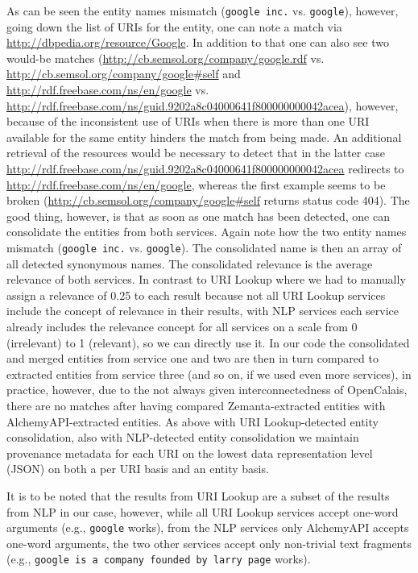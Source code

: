 \documentclass{acm_proc_article-sp}
\begin{document}
As can be seen the entity names mismatch (\texttt{google inc.} vs. \texttt{google}), however, going down the list of URIs for the entity, one can note a match via \url{http://dbpedia.org/resource/Google}. In addition to that one can also see two would-be matches (\url{http://cb.semsol.org/company/google.rdf} vs. \url{http://cb.semsol.org/company/google#self} and \url{http://rdf.freebase.com/ns/en/google} vs. \url{http://rdf.freebase.com/ns/guid.9202a8c04000641f800000000042acea}), however, because of the inconsistent use of URIs when there is more than one URI available for the same entity hinders the match from being made. An additional retrieval of the resources would be necessary to detect that in the latter case \url{http://rdf.freebase.com/ns/guid.9202a8c04000641f800000000042acea} redirects to \url{http://rdf.freebase.com/ns/en/google}, whereas the first example seems to be broken (\url{http://cb.semsol.org/company/google#self} returns status code 404). The good thing, however, is that as soon as one match has been detected, one can consolidate the entities from both services. Again note how the two entity names mismatch (\texttt{google inc.} vs. \texttt{google}). The consolidated name is then an array of all detected synonymous names. The consolidated relevance is the average relevance of both services. In contrast to URI Lookup where we had to manually assign a relevance of 0.25 to each result because not all URI Lookup services include the concept of relevance in their results, with NLP services each service already includes the relevance concept for all services on a scale from 0 (irrelevant) to 1 (relevant), so we can directly use it. In our code the consolidated and merged entities from service one and two are then in turn compared to extracted entities from service three (and so on, if we used even more services), in practice, however, due to the not always given interconnectedness of OpenCalais, there are no matches after having compared Zemanta-extracted entities with AlchemyAPI-extracted entities. As above with URI Lookup-detected entity consolidation, also with NLP-detected entity consolidation we maintain provenance metadata for each URI on the lowest data representation level (JSON) on both a per URI basis and an entity basis.  

It is to be noted that the results from URI Lookup are a subset of the results from NLP in our case, however, while all URI Lookup services accept one-word arguments (e.g., \texttt{google} works), from the NLP services only AlchemyAPI accepts one-word arguments, the two other services accept only non-trivial text fragments (e.g., \texttt{google is a company founded by larry page} works). 
\end{document}

